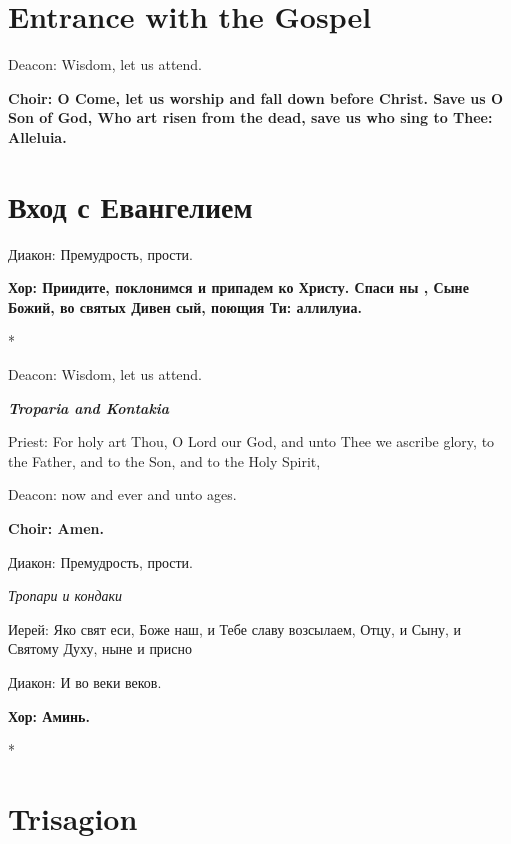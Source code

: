 \documentclass[12pt,a4paper,titlepage]{report}
\begin{document}
\begin{paracol}[1]{2}
	\section*{Entrance with the Gospel}
	
	Deacon: Wisdom, let us attend.
	
	\textbf{Choir: O Come, let us worship and fall down before Christ. Save us O Son of God, Who art risen from the dead, save us who sing to Thee: Alleluia.}
	
	\switchcolumn[1]
	
	\section*{Вход с Евангелием}
	
	Диакон: Премудрость, прости.
	
	\textbf{Хор: Приидите, поклонимся и припадем ко Христу. Спаси ны , Сыне Божий, во святых Дивен сый, поющия Ти: аллилуиа.}
	
	\switchcolumn[0]*
	
	Deacon: Wisdom, let us attend.
	
	\medskip
	\textit{\textbf{Troparia and Kontakia}}
	\medskip
	
	Priest: For holy art Thou, O Lord our God, and unto Thee we ascribe glory, to the Father, and to the Son, and to the Holy Spirit,
	
	Deacon: now and ever and unto ages.
	
	\textbf{Choir: Amen.}
	
	\switchcolumn[1]
	
	Диакон: Премудрость, прости.
	
	\medskip
	\textit{Тропари и кондаки}
	\medskip
	
	Иерей: Яко свят еси, Боже наш, и Тебе славу возсылаем, Отцу, и Сыну, и Святому Духу, ныне и присно
	
	Диакон: И во веки веков.
	
	\textbf{Хор: Аминь.}
	
	\switchcolumn[0]*
	
	\section*{Trisagion}
	

\end{paracol}
\end{document}
